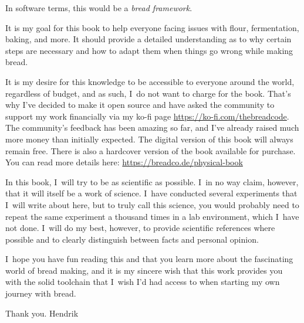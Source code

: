 In software terms, this would be a \emph{bread framework}.

It is my goal for this book to help everyone facing issues with flour, fermentation, baking,
and more. It should provide a detailed understanding as to why certain steps are necessary
and how to adapt them when things go wrong while making bread.

It is my desire for this knowledge to be accessible to everyone around the world, regardless
of budget, and as such, I~do not want to charge for the book. That's why I've decided to make
it open source and have asked the community to support my work financially via my ko-fi page
\url{https://ko-fi.com/thebreadcode}. The community's feedback has been amazing so far, and
I've already raised much more money than initially expected. The digital version of this book
will always remain free. There is also a hardcover version of the book available for purchase.
You can read more details here: \url{https://breadco.de/physical-book}

In this book, I~will try to be as scientific as possible. I~in no way claim, however, that
it will itself be a work of science. I~have conducted several experiments that I~will write
about here, but to truly call this science, you would probably need to repeat the same experiment
a thousand times in a lab environment, which I~have not done. I~will do my best, however, to provide
scientific references where possible and to clearly distinguish between facts and personal opinion.

I~hope you have fun reading this and that you learn more about the fascinating world of bread
making, and it is my sincere wish that this work provides you with the solid toolchain that I~wish
I'd had access to when starting my own journey with bread.

Thank you.
Hendrik
